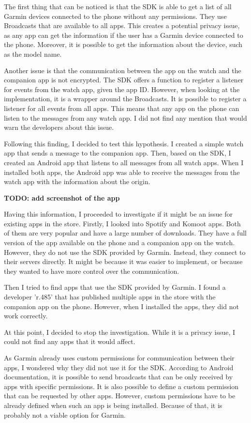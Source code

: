 The first thing that can be noticed is that the SDK is able to get a list of all Garmin devices connected to the phone without any permissions.
They use Broadcasts that are available to all apps.
This creates a potential privacy issue, as any app can get the information if the user has a Garmin device connected to the phone.
Moreover, it is possible to get the information about the device, such as the model name.

Another issue is that the communication between the app on the watch and the companion app is not encrypted.
The SDK offers a function to register a listener for events from the watch app, given the app ID\@.
However, when looking at the implementation, it is a wrapper around the Broadcasts.
It is possible to register a listener for all events from all apps.
This means that any app on the phone can listen to the messages from any watch app.
I did not find any mention that would warn the developers about this issue.

Following this finding, I decided to test this hypothesis.
I created a simple watch app that sends a message to the companion app.
Then, based on the SDK, I created an Android app that listens to all messages from all watch apps.
When I installed both apps, the Android app was able to receive the messages from the watch app with the information about the origin.

\textbf{TODO: add screenshot of the app}

Having this information, I proceeded to investigate if it might be an issue for existing apps in the store.
Firstly, I looked into Spotify and Komoot apps.
Both of them are very popular and have a large number of downloads.
They have a full version of the app available on the phone and a companion app on the watch.
However, they do not use the SDK provided by Garmin.
Instead, they connect to their servers directly.
It might be because it was easier to implement, or because they wanted to have more control over the communication.

Then I tried to find apps that use the SDK provided by Garmin.
I found a developer 'r.485' that has published multiple apps in the store with the companion app on the phone.
However, when I installed the apps, they did not work correctly.

At this point, I decided to stop the investigation.
While it is a privacy issue, I could not find any apps that it would affect.


As Garmin already uses custom permissions for communication between their apps, I wondered why they did not use it for the SDK\@.
According to Android documentation,\cite{android-broadcasts} it is possible to send broadcasts that can be only received by apps with specific permissions.
It is also possible to define a custom permission that can be requested by other apps.
However, custom permissions have to be already defined when such an app is being installed.
Because of that, it is probably not a viable option for Garmin.

